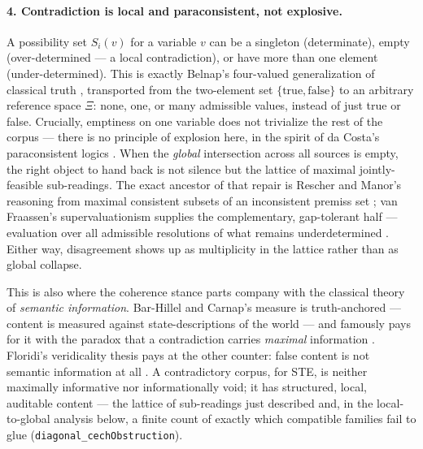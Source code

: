 \documentclass[11pt]{article}
\newcommand{\code}[1]{\texttt{#1}}
\begin{document}
\paragraph{4. Contradiction is local and paraconsistent, not
explosive.}
A possibility set $S_i(v)$ for a variable $v$ can be a singleton
(determinate), empty (over-determined --- a local contradiction), or
have more than one element (under-determined). This is exactly Belnap's
four-valued generalization of classical truth
\citep{belnap1977computer}, transported from the two-element set
$\{\text{true}, \text{false}\}$ to an arbitrary reference space $\Xi$:
none, one, or many admissible values, instead of just true or false.
Crucially, emptiness on one variable does not trivialize the rest of
the corpus --- there is no principle of explosion here, in the spirit
of da Costa's paraconsistent logics \citep{dacosta1974paraconsistent}.
When the \emph{global} intersection across all sources is empty, the
right object to hand back is not silence but the lattice of maximal
jointly-feasible sub-readings. The exact ancestor of that repair is
Rescher and Manor's reasoning from maximal consistent subsets of an
inconsistent premiss set \citep{rescher1970}; van Fraassen's
supervaluationism supplies the complementary, gap-tolerant half ---
evaluation over all admissible resolutions of what remains
underdetermined \citep{vanfraassen1966supervaluations}. Either way,
disagreement shows up as multiplicity in the lattice rather than as
global collapse.

This is also where the coherence stance parts company with the
classical theory of \emph{semantic information}. Bar-Hillel and
Carnap's measure is truth-anchored --- content is measured against
state-descriptions of the world --- and famously pays for it with the
paradox that a contradiction carries \emph{maximal} information
\citep{barhillel1952semantic}. Floridi's veridicality thesis pays at
the other counter: false content is not semantic information at all
\citep{floridi2011semantic}. A contradictory corpus, for STE, is
neither maximally informative nor informationally void; it has
structured, local, auditable content --- the lattice of sub-readings
just described and, in the local-to-global analysis below, a finite
count of exactly which compatible families fail to glue
(\code{diagonal\_cechObstruction}).
\end{document}
